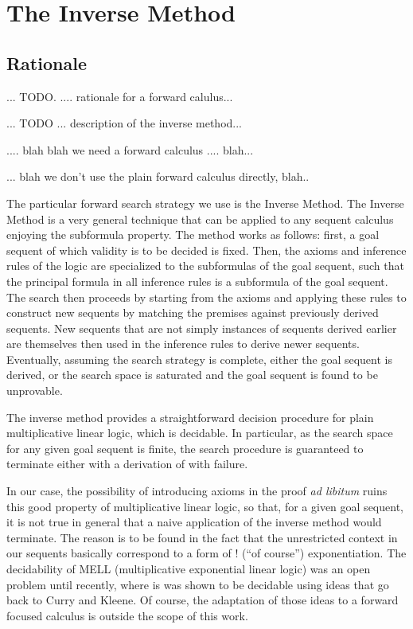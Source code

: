 \section{The Inverse Method}

\subsection{Rationale}

... TODO. .... rationale for a forward calulus...

... TODO ... description of the inverse method...


.... blah blah we need a forward calculus .... blah...

... blah we don't use the plain forward calculus directly, blah..



The particular forward search strategy we use is the Inverse Method. The Inverse
Method is a very general technique that can be applied to any sequent calculus
enjoying the subformula property. The method works as follows: first, a goal
sequent of which validity is to be decided is fixed. Then, the axioms and
inference rules of the logic are specialized to the subformulas of the goal
sequent, such that the principal formula in all inference rules is a subformula
of the goal sequent. The search then proceeds by starting from the axioms and
applying these rules to construct new sequents by matching the premises against
previously derived sequents. New sequents that are not simply instances of
sequents derived earlier are themselves then used in the inference rules to
derive newer sequents. Eventually, assuming the search strategy is complete,
either the goal sequent is derived, or the search space is saturated and the
goal sequent is found to be unprovable.

The inverse method provides a straightforward decision procedure for plain
multiplicative linear logic, which is decidable. In particular, as the search
space for any given goal sequent is finite, the search procedure is guaranteed
to terminate either with a derivation of with failure.

In our case, the possibility of introducing axioms in the proof \emph{ad
  libitum} ruins this good property of multiplicative linear logic, so that, for
a given goal sequent, it is not true in general that a naive application of the
inverse method would terminate.
The reason is to be found in the fact that the unrestricted context in our
sequents basically correspond to a form of ! (``of course'')
exponentiation. The decidability of MELL (multiplicative exponential linear
logic) was an open problem until recently, where is was shown to be decidable
using ideas that go back to Curry and Kleene. Of course, the adaptation of those
ideas to a forward focused calculus is outside the scope of this work.

